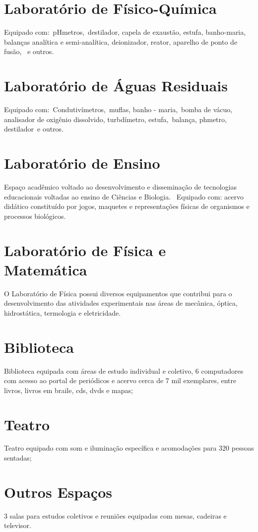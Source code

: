 \documentclass[11pt,fleqn]{book} %
\begin{document}
\section{Laboratório de Físico-Química}
Equipado com: pHmetros, destilador, capela de exaustão, estufa, banho-maria, balanças analítica e semi-analítica, deionizador, reator, aparelho de ponto de fusão,  e outros.

\section{Laboratório de Águas Residuais}
Equipado com: Condutivímetros, muflas, banho - maria, bomba de vácuo, analisador de oxigênio dissolvido, turbdímetro, estufa, balança, phmetro, destilador e outros.

\section{Laboratório de Ensino}
Espaço acadêmico voltado ao desenvolvimento e disseminação de tecnologias educacionais voltadas ao ensino de Ciências e Biologia.  Equipado com: acervo didático constituído por jogos, maquetes e representações físicas de organismos e processos biológicos.

\section{Laboratório de Física e Matemática}
O Laboratório de Física possui diversos equipamentos que contribui para o desenvolvimento das atividades experimentais nas áreas de mecânica, óptica, hidrostática, termologia e eletricidade.

\section{Biblioteca}
Biblioteca equipada com áreas de estudo individual e coletivo, 6 computadores com acesso ao portal de periódicos e acervo cerca de 7 mil exemplares, entre livros, livros em braile, cds, dvds e mapas;

\section{Teatro}
Teatro equipado com som e iluminação específica e acomodações para 320 pessoas sentadas;

\section{Outros Espaços}
3 salas para estudos coletivos e reuniões equipadas com mesas, cadeiras e televisor.
\end{document}
